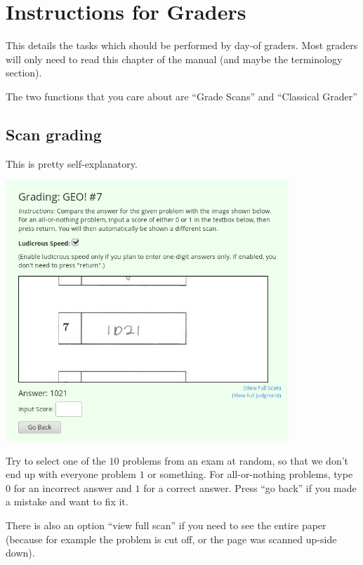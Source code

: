 \chapter{Instructions for Graders}
This details the tasks which should be performed by day-of graders.
Most graders will only need to read this chapter of the manual
(and maybe the terminology section).

The two functions that you care about are ``Grade Scans''
and ``Classical Grader''

\section{Scan grading}
This is pretty self-explanatory.

\begin{center}
	\includegraphics[width=0.8\textwidth]{images/scangrade.png}
\end{center}

\begin{itemize}
	\ii Try to select one of the $10$ problems from an exam at random,
	so that we don't end up with everyone problem $1$ or something.
	\ii For all-or-nothing problems,
	type $0$ for an incorrect answer and $1$ for a correct answer.
	\ii Press ``go back'' if you made a mistake and want to fix it.
\end{itemize}

There is also an option ``view full scan'' if you need
to see the entire paper
(because for example the problem is cut off,
or the page was scanned up-side down).

